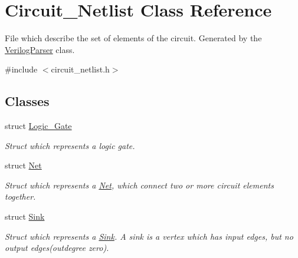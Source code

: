 \hypertarget{classCircuit__Netlist}{\section{Circuit\-\_\-\-Netlist Class Reference}
\label{classCircuit__Netlist}
}


File which describe the set of elements of the circuit. Generated by the \hyperlink{classVerilogParser}{Verilog\-Parser} class.  




{\ttfamily \#include $<$circuit\-\_\-netlist.\-h$>$}

\subsection*{Classes}
\begin{DoxyCompactItemize}
\item 
struct \hyperlink{structCircuit__Netlist_1_1Logic__Gate}{Logic\-\_\-\-Gate}
\begin{DoxyCompactList}\small\item\em Struct which represents a logic gate. \end{DoxyCompactList}\item 
struct \hyperlink{structCircuit__Netlist_1_1Net}{Net}
\begin{DoxyCompactList}\small\item\em Struct which represents a \hyperlink{structCircuit__Netlist_1_1Net}{Net}, which connect two or more circuit elements together. \end{DoxyCompactList}\item 
struct \hyperlink{structCircuit__Netlist_1_1Sink}{Sink}
\begin{DoxyCompactList}\small\item\em Struct which represents a \hyperlink{structCircuit__Netlist_1_1Sink}{Sink}. A sink is a vertex which has input edges, but no output edges(outdegree zero). \end{DoxyCompactList}\end{DoxyCompactItemize}
